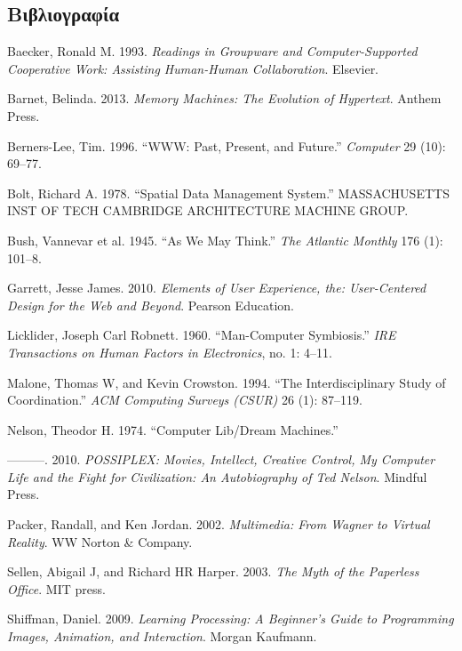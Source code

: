 \documentclass[
]{article}
\newlength{\cslhangindent}
\newlength{\cslentryspacingunit} %
\newenvironment{CSLReferences}[2] %
 {%
  \setlength{\parindent}{0pt}
  \ifodd #1
  \let\oldpar\par
  \def\par{\hangindent=\cslhangindent\oldpar}
  \fi
  \setlength{\parskip}{#2\cslentryspacingunit}
 }%
 {}
\begin{document}
\hypertarget{ux3b2ux3b9ux3b2ux3bbux3b9ux3bfux3b3ux3c1ux3b1ux3c6ux3afux3b1}{%
\subsection*{Βιβλιογραφία}\label{ux3b2ux3b9ux3b2ux3bbux3b9ux3bfux3b3ux3c1ux3b1ux3c6ux3afux3b1}}

\hypertarget{refs}{}
\begin{CSLReferences}{0}{0}
\end{CSLReferences}

Baecker, Ronald M. 1993. \emph{Readings in Groupware and
Computer-Supported Cooperative Work: Assisting Human-Human
Collaboration}. Elsevier.

Barnet, Belinda. 2013. \emph{Memory Machines: The Evolution of
Hypertext}. Anthem Press.

Berners-Lee, Tim. 1996. {``WWW: Past, Present, and Future.''}
\emph{Computer} 29 (10): 69--77.

Bolt, Richard A. 1978. {``Spatial Data Management System.''}
MASSACHUSETTS INST OF TECH CAMBRIDGE ARCHITECTURE MACHINE GROUP.

Bush, Vannevar et al. 1945. {``As We May Think.''} \emph{The Atlantic
Monthly} 176 (1): 101--8.

Garrett, Jesse James. 2010. \emph{Elements of User Experience, the:
User-Centered Design for the Web and Beyond}. Pearson Education.

Licklider, Joseph Carl Robnett. 1960. {``Man-Computer Symbiosis.''}
\emph{IRE Transactions on Human Factors in Electronics}, no. 1: 4--11.

Malone, Thomas W, and Kevin Crowston. 1994. {``The Interdisciplinary
Study of Coordination.''} \emph{ACM Computing Surveys (CSUR)} 26 (1):
87--119.

Nelson, Theodor H. 1974. {``Computer Lib/Dream Machines.''}

---------. 2010. \emph{POSSIPLEX: Movies, Intellect, Creative Control,
My Computer Life and the Fight for Civilization: An Autobiography of Ted
Nelson}. Mindful Press.

Packer, Randall, and Ken Jordan. 2002. \emph{Multimedia: From Wagner to
Virtual Reality}. WW Norton \& Company.

Sellen, Abigail J, and Richard HR Harper. 2003. \emph{The Myth of the
Paperless Office}. MIT press.

Shiffman, Daniel. 2009. \emph{Learning Processing: A Beginner's Guide to
Programming Images, Animation, and Interaction}. Morgan Kaufmann.
\end{document}
